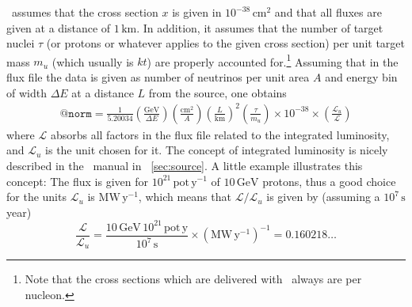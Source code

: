 \begin{appendix}
\GLOBES\ assumes that the cross
section $x$ is given in $10^{-38}\,\mathrm{cm}^2$ and that all fluxes are
given at a distance of $1\,\mathrm{km}$. In addition, it assumes that
the number of target nuclei $\tau$ (or protons or whatever applies to the
given cross section) per unit target mass $m_u$ (which usually is $kt$)
 are properly accounted for.\footnote{Note that the cross sections which are delivered with
  \GLOBES\ always are per nucleon.}  Assuming that in the flux file
the data is given as number of neutrinos per unit area $A$ and
energy bin of width $\Delta E$ at a distance $L$ from the source, one
obtains
\begin{eqnarray}
\mathtt{@norm}=\frac{1}{5.20034}\left(\frac{\mathrm{GeV}}{\Delta
      E}\right)
\left(\frac{\mathrm{cm}^2}{A}\right)\left(\frac{L}{\mathrm{km}}\right)^2\left(\frac{\tau}{m_u}\right)\times10^{-38}\times\left(\frac{\mathcal{L}_u}{\mathcal{L}}\right)
\end{eqnarray}
where $\mathcal{L}$ absorbs all factors in the flux file related to
the integrated luminosity, and $\mathcal{L}_u$ is the unit chosen for
it.  The concept of integrated luminosity is
nicely described in the \GLOBES\ manual in \Sec~\ref{sec:source}.
A little example illustrates this concept:
The flux is given for $10^{21}\, \mathrm{pot}\,\mathrm{y}^{-1}$ of
$10\,\mathrm{GeV}$ protons, thus a good choice for the units $\mathcal{L}_u$
is $\mathrm{MW}\,\mathrm{y}^{-1}$, which means that
$\mathcal{L}/\mathcal{L}_u$ is given by (assuming a $10^7\,\mathrm{s}$
year)
\begin{equation}
\frac{\mathcal{L}}{\mathcal{L}_u}=\frac{10\,\mathrm{GeV}\,10^{21}\,\mathrm{pot}\,\mathrm{y}}{10^7\,\mathrm{s}}\times(\mathrm{MW}\,\mathrm{y}^{-1})^{-1}=0.160218\ldots
\end{equation}


{\footnotesize



}


\end{appendix}

